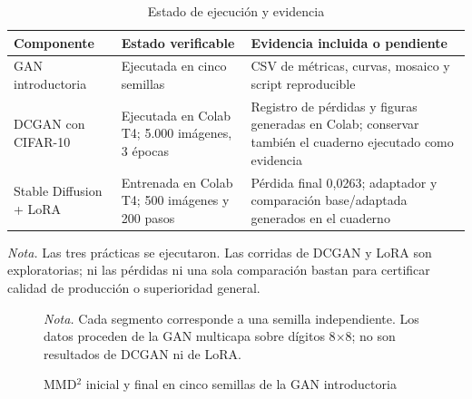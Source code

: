 \documentclass[12pt,letterpaper]{article}
\begin{document}
\begin{table}[H]
\caption{Estado de ejecución y evidencia}
\label{tab:estado}
\small\begin{tabularx}{\textwidth}{p{}p{}X}
\toprule
Componente & Estado verificable & Evidencia incluida o pendiente \\
\midrule
GAN introductoria & Ejecutada en cinco semillas & CSV de métricas, curvas, mosaico y script reproducible \\
DCGAN con CIFAR-10 & Ejecutada en Colab T4; 5.000 imágenes, 3 épocas & Registro de pérdidas y figuras generadas en Colab; conservar también el cuaderno ejecutado como evidencia \\
Stable Diffusion + LoRA & Entrenada en Colab T4; 500 imágenes y 200 pasos & Pérdida final 0,0263; adaptador y comparación base/adaptada generados en el cuaderno \\
\bottomrule
\end{tabularx}
\par\raggedright\vspace{5pt}\noindent\footnotesize\textit{Nota.} Las tres prácticas se ejecutaron. Las corridas de DCGAN y LoRA son exploratorias; ni las pérdidas ni una sola comparación bastan para certificar calidad de producción o superioridad general.\normalsize
\end{table}

\begin{figure}[H]
\caption{MMD$^2$ inicial y final en cinco semillas de la GAN introductoria}
\centering
{}
\par\raggedright\vspace{5pt}\noindent\footnotesize\textit{Nota.} Cada segmento corresponde a una semilla independiente. Los datos proceden de la GAN multicapa sobre dígitos 8$\times$8; no son resultados de DCGAN ni de LoRA.\normalsize
\end{figure}
\end{document}
